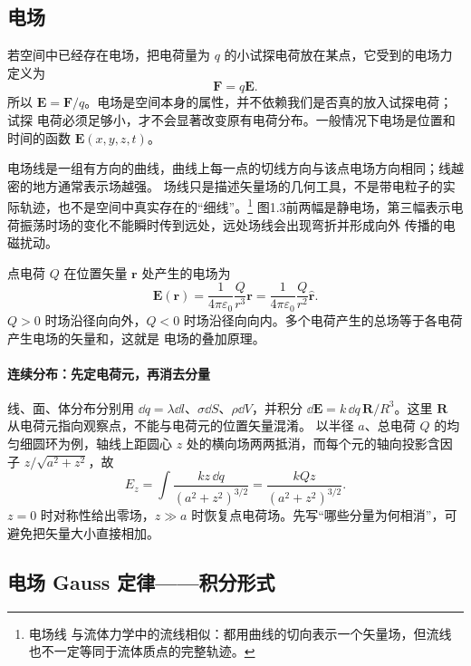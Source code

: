 \subsection*{电场}

若空间中已经存在电场，把电荷量为 $q$ 的小试探电荷放在某点，它受到的电场力定义为
\begin{equation}
  \boxed{\boldsymbol F=q\boldsymbol E}.
\end{equation}
所以 $\boldsymbol E=\boldsymbol F/q$。电场是空间本身的属性，并不依赖我们是否真的放入试探电荷；试探
电荷必须足够小，才不会显著改变原有电荷分布。一般情况下电场是位置和时间的函数
$\boldsymbol E(x,y,z,t)$。

电场线是一组有方向的曲线，曲线上每一点的切线方向与该点电场方向相同；线越密的地方通常表示场越强。
场线只是描述矢量场的几何工具，不是带电粒子的实际轨迹，也不是空间中真实存在的“细线”。\footnote{电场线
与流体力学中的流线相似：都用曲线的切向表示一个矢量场，但流线也不一定等同于流体质点的完整轨迹。}
图1.3前两幅是静电场，第三幅表示电荷振荡时场的变化不能瞬时传到远处，远处场线会出现弯折并形成向外
传播的电磁扰动。

\fieldLineGallery
{}

点电荷 $Q$ 在位置矢量 $\boldsymbol r$ 处产生的电场为
\begin{equation}
  \boxed{\boldsymbol E(\boldsymbol r)
  =\frac{1}{4\pi\varepsilon_0}\frac{Q}{r^3}\boldsymbol r
  =\frac{1}{4\pi\varepsilon_0}\frac{Q}{r^2}\hat{\boldsymbol r}}.
\end{equation}
$Q>0$ 时场沿径向向外，$Q<0$ 时场沿径向向内。多个电荷产生的总场等于各电荷产生电场的矢量和，这就是
电场的叠加原理。


\paragraph{连续分布：先定电荷元，再消去分量}
线、面、体分布分别用 $\dd q=\lambda\dd l$、$\sigma\dd S$、$\rho\dd V$，并积分
$\dd\boldsymbol E=k\,\dd q\,\boldsymbol R/R^3$。这里 $\boldsymbol R$ 从电荷元指向观察点，不能与电荷元的位置矢量混淆。
以半径 $a$、总电荷 $Q$ 的均匀细圆环为例，轴线上距圆心 $z$ 处的横向场两两抵消，而每个元的轴向投影含因子 $z/\sqrt{a^2+z^2}$，故
\[
 E_z=\int\frac{kz\,\dd q}{(a^2+z^2)^{3/2}}
 =\frac{kQz}{(a^2+z^2)^{3/2}}.
\]
$z=0$ 时对称性给出零场，$z\gg a$ 时恢复点电荷场。先写“哪些分量为何相消”，可避免把矢量大小直接相加。

\subsection*{电场 Gauss 定律——积分形式}


